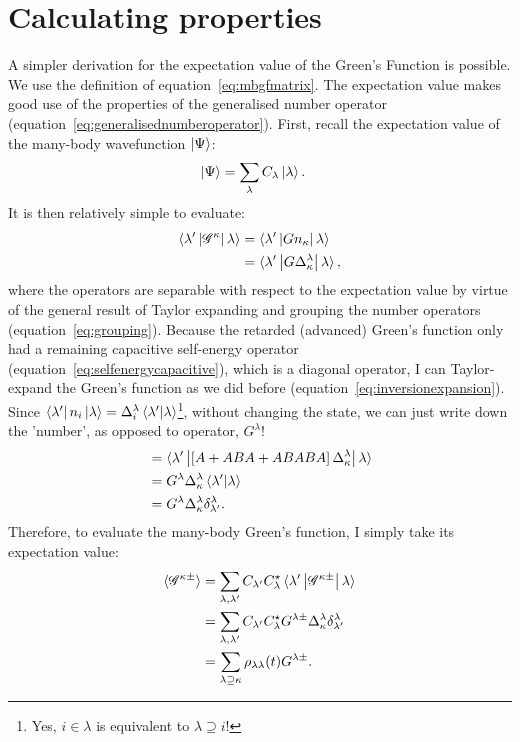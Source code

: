 \section{Calculating properties}
\label{sec:calcprop}
A simpler derivation for the expectation value of the Green's Function is possible. We use the definition of equation~\ref{eq:mbgfmatrix}. The expectation value makes good use of the properties of the generalised number operator (equation~\ref{eq:generalisednumberoperator}). First, recall the expectation value of the many-body wavefunction $\ket{\Psi}$:
\begin{align*}
\ket{\Psi} &= \sum_\lambda C_\lambda \ket{\lambda}.
\end{align*}
It is then relatively simple to evaluate:
\begin{align*}
\braket{\lambda^\prime \left| \mathscr{G}^\kappa \right| \lambda } &= 
\braket{\lambda^\prime \left|  G n_\kappa \right| \lambda } \\
&= \braket{\lambda^\prime \left| G \Delta^\lambda_\kappa \right| \lambda },
\end{align*} where the operators are separable with respect to the expectation value by virtue of the general result of Taylor expanding and grouping the number operators (equation~\ref{eq:grouping}).
Because the retarded (advanced) Green's function only had a remaining capacitive self-energy operator (equation~\ref{eq:selfenergycapacitive}), which is a diagonal operator, I can Taylor-expand the Green's function as we did before (equation~\ref{eq:inversionexpansion}). Since $\bra{\lambda'}n_i \ket{\lambda}=\Delta^\lambda_i\braket{\lambda'|\lambda}$\footnote{Yes, $i \in \lambda$ is equivalent to $\lambda\supseteq i$!}, without changing the state, we can just write down the 'number', as opposed to operator,  $G^\lambda$! 
\begin{align*}
&= \braket{\lambda^\prime \left| \left[ A + ABA + ABABA \right] \Delta^\lambda_\kappa \right| \lambda } \\
&=  G^\lambda \Delta^\lambda_\kappa \braket{\lambda^\prime | \lambda }\\
&=  G^\lambda \Delta^\lambda_\kappa \delta^\lambda_{\lambda^\prime}.
\end{align*}
Therefore, to evaluate the many-body Green's function, I simply take its expectation value:
\begin{align*}
\braket{ \mathscr{G}^{\kappa\pm}} &= \sum_{\lambda,\lambda^\prime}C_{\lambda^\prime}C_\lambda^\star \braket{\lambda^\prime \left| \mathscr{G}^{\kappa\pm} \right| \lambda } \\
&= \sum_{\lambda,\lambda^\prime} C_{\lambda^\prime}C_\lambda^\star  G^{\lambda\pm} \Delta^\lambda_\kappa \delta^\lambda_{\lambda^\prime}\\
&= \sum_{\lambda \supseteq \kappa} \rho_{\lambda\lambda}(t) G^{\lambda\pm} .
\end{align*}
